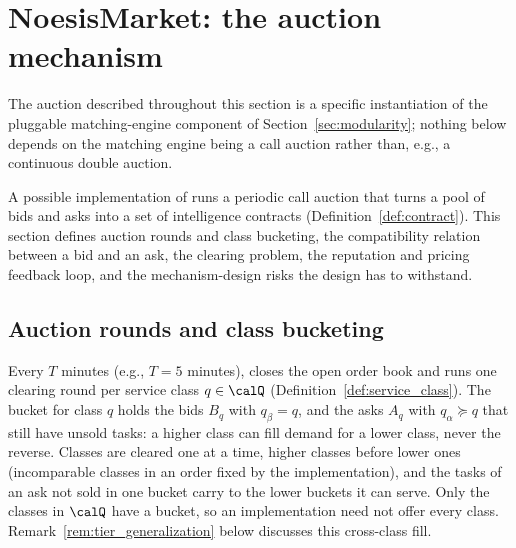 \section{NoesisMarket: the auction mechanism}
\label{sec:noesis_market}

The auction described throughout this section is a specific
instantiation of the pluggable matching-engine component of
Section~\ref{sec:modularity}; nothing below depends on the matching engine
being a call auction rather than, e.g., a continuous double auction.

A possible implementation of \NoesisMarket{} runs a periodic call auction that
turns a pool of bids and asks into a set of intelligence contracts
(Definition~\ref{def:contract}). This section defines auction rounds and class
bucketing, the compatibility relation between a bid and an ask, the clearing
problem, the reputation and pricing feedback loop, and the mechanism-design
risks the design has to withstand. 

\subsection{Auction rounds and class bucketing}
\label{sec:rounds}

Every $T$ minutes (e.g., $T = 5$ minutes), \NoesisMarket{} closes the open
order book and runs one clearing round per service class $q \in \calQ$
(Definition~\ref{def:service_class}). The bucket for class $q$ holds the bids
$B_q$ with $q_\beta = q$, and the asks $A_q$ with $q_\alpha \succeq q$ that
still have unsold tasks: a higher class can fill demand for a lower class,
never the reverse. Classes are cleared one at a time, higher classes before
lower ones (incomparable classes in an order fixed by the implementation),
and the tasks of an ask not sold in one bucket carry to the lower buckets it
can serve. Only the classes in $\calQ$ have a bucket, so an implementation
need not offer every class. Remark~\ref{rem:tier_generalization} below
discusses this cross-class fill.


